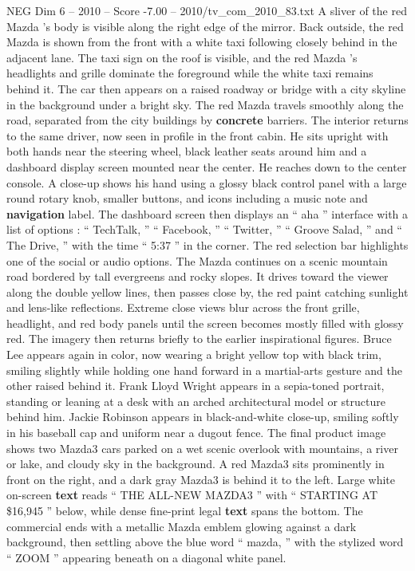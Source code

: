 \begin{textsample}{NEG Dim 6 – 2010 – Score -7.00 – 2010/tv\_com\_2010\_83.txt}
A sliver of the red Mazda ’s body is visible along the right edge of the mirror.
Back outside, the red Mazda is shown from the front with a white taxi following closely behind in the adjacent lane.
The taxi sign on the roof is visible, and the red Mazda ’s headlights and grille dominate the foreground while the white taxi remains behind it.
The car then appears on a raised roadway or bridge with a city skyline in the background under a bright sky.
The red Mazda travels smoothly along the road, separated from the city buildings by \textbf{concrete} barriers.
The interior returns to the same driver, now seen in profile in the front cabin.
He sits upright with both hands near the steering wheel, black leather seats around him and a dashboard display screen mounted near the center.
He reaches down to the center console.
A close-up shows his hand using a glossy black control panel with a large round rotary knob, smaller buttons, and icons including a music note and \textbf{navigation} label.
The dashboard screen then displays an “ aha ” interface with a list of options : “ TechTalk, ” “ Facebook, ” “ Twitter, ” “ Groove Salad, ” and “ The Drive, ” with the time “ 5:37 ” in the corner.
The red selection bar highlights one of the social or audio options.
The Mazda continues on a scenic mountain road bordered by tall evergreens and rocky slopes.
It drives toward the viewer along the double yellow lines, then passes close by, the red paint catching sunlight and lens-like reflections.
Extreme close views blur across the front grille, headlight, and red body panels until the screen becomes mostly filled with glossy red.
The imagery then returns briefly to the earlier inspirational figures.
Bruce Lee appears again in color, now wearing a bright yellow top with black trim, smiling slightly while holding one hand forward in a martial-arts gesture and the other raised behind it.
Frank Lloyd Wright appears in a sepia-toned portrait, standing or leaning at a desk with an arched architectural model or structure behind him.
Jackie Robinson appears in black-and-white close-up, smiling softly in his baseball cap and uniform near a dugout fence.
The final product image shows two Mazda3 cars parked on a wet scenic overlook with mountains, a river or lake, and cloudy sky in the background.
A red Mazda3 sits prominently in front on the right, and a dark gray Mazda3 is behind it to the left.
Large white on-screen \textbf{text} reads “ THE ALL-NEW MAZDA3 ” with “ STARTING AT \$16,945 ” below, while dense fine-print legal \textbf{text} spans the bottom.
The commercial ends with a metallic Mazda emblem glowing against a dark background, then settling above the blue word “ mazda, ” with the stylized word “ ZOOM ” appearing beneath on a diagonal white panel.

\end{textsample}
